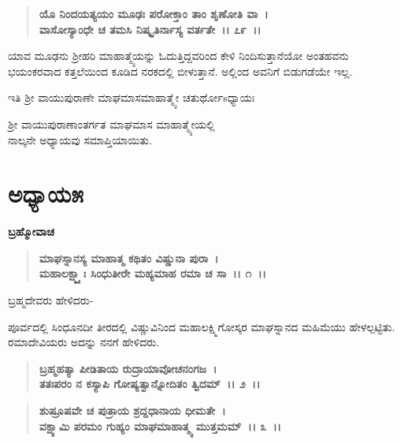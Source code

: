\begin{verse}
\textbf{ಯೊ ನಿಂದಯತ್ಯಯಂ ಮೂಢಃ ಪರೋಕ್ತಾಂ ತಾಂ ಶೃಣೋತಿ ವಾ~।}\\\textbf{ವಾಸೋಸ್ಯಾಂಧೇ ಚ ತಮಸಿ ನಿಷ್ಕೃತಿರ್ನಾಸ್ಯ ವರ್ತತೇ~।। ೭೯~।।}
\end{verse}

ಯಾವ ಮೂಢನು ಶ‍್ರೀಹರಿ ಮಾಹಾತ್ಮ್ಯೆಯನ್ನು ಓದುತ್ತಿದ್ದವರಿಂದ ಕೇಳಿ ನಿಂದಿಸುತ್ತಾನೆಯೋ ಅಂತಹವನು ಭಯಂಕರವಾದ ಕತ್ತಲೆಯಿಂದ ಕೂಡಿದ ನರಕದಲ್ಲಿ ಬೀಳುತ್ತಾನೆ. ಅಲ್ಲಿಂದ ಅವನಿಗೆ ಬಿಡುಗಡೆಯೇ ಇಲ್ಲ.

\begin{center}
ಇತಿ ಶ‍್ರೀ ವಾಯುಪುರಾಣೇ ಮಾಘಮಾಸಮಾಹಾತ್ಮ್ಯೇ ಚತುರ್ಥೋsಧ್ಯಾಯಃ
\end{center}

\begin{center}
 ಶ‍್ರೀ ವಾಯುಪುರಾಣಾಂತರ್ಗತ ಮಾಘಮಾಸ ಮಾಹಾತ್ಮ್ಯೇಯಲ್ಲಿ \\ ನಾಲ್ಕನೇ ಅಧ್ಯಾಯವು ಸಮಾಪ್ತಿಯಾಯಿತು.
\end{center}

\newpage

\section*{ಅಧ್ಯಾಯ\enginline{-}೫}

\begin{flushleft}
\textbf{ಬ್ರಹ್ಮೋವಾಚ\enginline{-}}
\end{flushleft}

\begin{verse}
\textbf{ಮಾಘಸ್ನಾನಸ್ಯ ಮಾಹಾತ್ಮ ಕಥಿತಂ ವಿಷ್ಣುನಾ ಪುರಾ~। }\\\textbf{ಮಹಾಲಕ್ಷ್ಮ್ಯಾಃ ಸಿಂಧುತೀರೇ ಮಹ್ಯಮಾಹ ರಮಾ ಚ ಸಾ~।। ೧~।।}
\end{verse}

\begin{flushleft}
ಬ್ರಹ್ಮದೇವರು ಹೇಳಿದರು-
\end{flushleft}

ಪೂರ್ವದಲ್ಲಿ ಸಿಂಧೂನದೀ ತೀರದಲ್ಲಿ ವಿಷ್ಣುವಿನಿಂದ ಮಹಾಲಕ್ಷ್ಮಿಗೋಸ್ಕರ ಮಾಘಸ್ನಾನದ ಮಹಿಮೆಯು ಹೇಳಲ್ಪಟ್ಟಿತು. ರಮಾದೇವಿಯರು ಅದನ್ನು ನನಗೆ ಹೇಳಿದರು.

\begin{verse}
\textbf{ಬ್ರಹ್ಮಹತ್ಯಾ ಪೀಡಿತಾಯ ರುದ್ರಾಯಾವೋಚನಂಗಜ~।}\\\textbf{ತತಃಪರಂ ನ ಕಸ್ಯಾಪಿ ಗೋಷ್ಯತ್ವಾನ್ನೋದಿತಂ ತ್ವಿದಮ್~।। ೨~।।} 
\end{verse}

\begin{verse}
\textbf{ಶುಷ್ರೂಷವೇ ಚ ಪುತ್ರಾಯ ಶ್ರದ್ದಧಾನಾಯ ಧೀಮತೇ~।}\\\textbf{ವಕ್ಷ್ಯಾಮಿ ಪರಮಂ ಗುಹ್ಯಂ ಮಾಘಮಾಹಾತ್ಮ್ಯ ಮುತ್ತಮಮ್~।। ೩~।।}
\end{verse}

